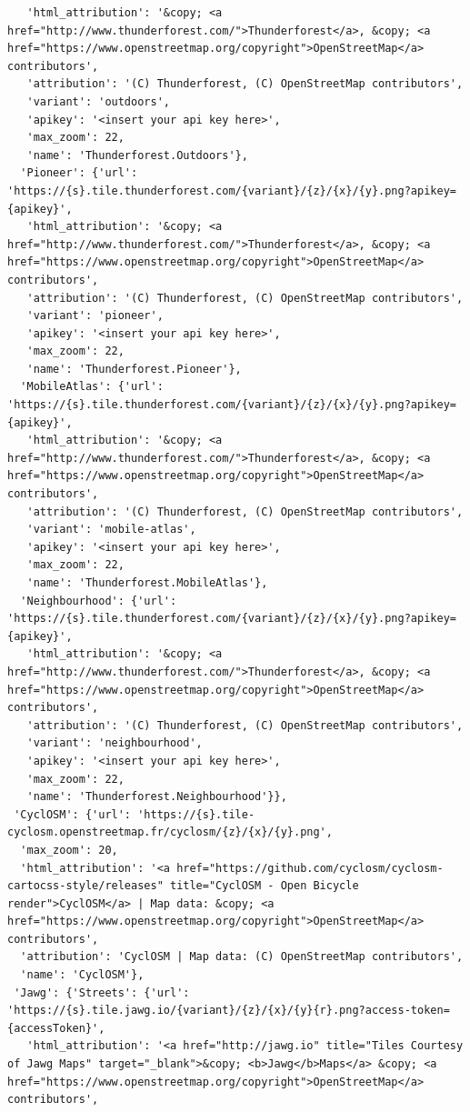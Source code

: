 \documentclass[
  letterpaper,
  DIV=11,
  numbers=noendperiod]{scrreprt}
\begin{document}
\begin{verbatim}
   'html_attribution': '&copy; <a href="http://www.thunderforest.com/">Thunderforest</a>, &copy; <a href="https://www.openstreetmap.org/copyright">OpenStreetMap</a> contributors',
   'attribution': '(C) Thunderforest, (C) OpenStreetMap contributors',
   'variant': 'outdoors',
   'apikey': '<insert your api key here>',
   'max_zoom': 22,
   'name': 'Thunderforest.Outdoors'},
  'Pioneer': {'url': 'https://{s}.tile.thunderforest.com/{variant}/{z}/{x}/{y}.png?apikey={apikey}',
   'html_attribution': '&copy; <a href="http://www.thunderforest.com/">Thunderforest</a>, &copy; <a href="https://www.openstreetmap.org/copyright">OpenStreetMap</a> contributors',
   'attribution': '(C) Thunderforest, (C) OpenStreetMap contributors',
   'variant': 'pioneer',
   'apikey': '<insert your api key here>',
   'max_zoom': 22,
   'name': 'Thunderforest.Pioneer'},
  'MobileAtlas': {'url': 'https://{s}.tile.thunderforest.com/{variant}/{z}/{x}/{y}.png?apikey={apikey}',
   'html_attribution': '&copy; <a href="http://www.thunderforest.com/">Thunderforest</a>, &copy; <a href="https://www.openstreetmap.org/copyright">OpenStreetMap</a> contributors',
   'attribution': '(C) Thunderforest, (C) OpenStreetMap contributors',
   'variant': 'mobile-atlas',
   'apikey': '<insert your api key here>',
   'max_zoom': 22,
   'name': 'Thunderforest.MobileAtlas'},
  'Neighbourhood': {'url': 'https://{s}.tile.thunderforest.com/{variant}/{z}/{x}/{y}.png?apikey={apikey}',
   'html_attribution': '&copy; <a href="http://www.thunderforest.com/">Thunderforest</a>, &copy; <a href="https://www.openstreetmap.org/copyright">OpenStreetMap</a> contributors',
   'attribution': '(C) Thunderforest, (C) OpenStreetMap contributors',
   'variant': 'neighbourhood',
   'apikey': '<insert your api key here>',
   'max_zoom': 22,
   'name': 'Thunderforest.Neighbourhood'}},
 'CyclOSM': {'url': 'https://{s}.tile-cyclosm.openstreetmap.fr/cyclosm/{z}/{x}/{y}.png',
  'max_zoom': 20,
  'html_attribution': '<a href="https://github.com/cyclosm/cyclosm-cartocss-style/releases" title="CyclOSM - Open Bicycle render">CyclOSM</a> | Map data: &copy; <a href="https://www.openstreetmap.org/copyright">OpenStreetMap</a> contributors',
  'attribution': 'CyclOSM | Map data: (C) OpenStreetMap contributors',
  'name': 'CyclOSM'},
 'Jawg': {'Streets': {'url': 'https://{s}.tile.jawg.io/{variant}/{z}/{x}/{y}{r}.png?access-token={accessToken}',
   'html_attribution': '<a href="http://jawg.io" title="Tiles Courtesy of Jawg Maps" target="_blank">&copy; <b>Jawg</b>Maps</a> &copy; <a href="https://www.openstreetmap.org/copyright">OpenStreetMap</a> contributors',

\end{verbatim}
\end{document}
